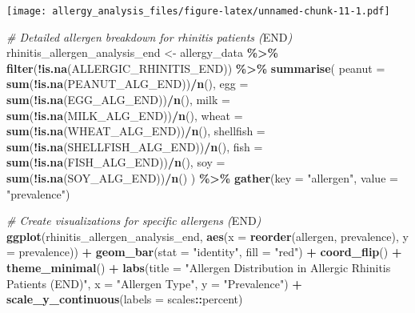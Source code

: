 \documentclass[
]{article}
\newenvironment{Shaded}{\begin{snugshade}}{\end{snugshade}}
\newcommand{\AttributeTok}[1]{\textcolor[rgb]{0.13,0.29,0.53}{#1}}
\newcommand{\CommentTok}[1]{\textcolor[rgb]{0.56,0.35,0.01}{\textit{#1}}}
\newcommand{\FunctionTok}[1]{\textcolor[rgb]{0.13,0.29,0.53}{\textbf{#1}}}
\newcommand{\NormalTok}[1]{#1}
\newcommand{\OtherTok}[1]{\textcolor[rgb]{0.56,0.35,0.01}{#1}}
\newcommand{\RegionMarkerTok}[1]{#1}
\newcommand{\SpecialCharTok}[1]{\textcolor[rgb]{0.81,0.36,0.00}{\textbf{#1}}}
\newcommand{\StringTok}[1]{\textcolor[rgb]{0.31,0.60,0.02}{#1}}
\begin{document}
\texttt{[image: allergy\_analysis\_files/figure-latex/unnamed-chunk-11-1.pdf]}

\begin{Shaded}
\begin{Highlighting}[]
\CommentTok{\# Detailed allergen breakdown for rhinitis patients (}\RegionMarkerTok{END}\CommentTok{)}
\NormalTok{rhinitis\_allergen\_analysis\_end }\OtherTok{\textless{}{-}}\NormalTok{ allergy\_data }\SpecialCharTok{\%\textgreater{}\%}
  \FunctionTok{filter}\NormalTok{(}\SpecialCharTok{!}\FunctionTok{is.na}\NormalTok{(ALLERGIC\_RHINITIS\_END)) }\SpecialCharTok{\%\textgreater{}\%}
  \FunctionTok{summarise}\NormalTok{(}
    \AttributeTok{peanut =} \FunctionTok{sum}\NormalTok{(}\SpecialCharTok{!}\FunctionTok{is.na}\NormalTok{(PEANUT\_ALG\_END))}\SpecialCharTok{/}\FunctionTok{n}\NormalTok{(),}
    \AttributeTok{egg =} \FunctionTok{sum}\NormalTok{(}\SpecialCharTok{!}\FunctionTok{is.na}\NormalTok{(EGG\_ALG\_END))}\SpecialCharTok{/}\FunctionTok{n}\NormalTok{(),}
    \AttributeTok{milk =} \FunctionTok{sum}\NormalTok{(}\SpecialCharTok{!}\FunctionTok{is.na}\NormalTok{(MILK\_ALG\_END))}\SpecialCharTok{/}\FunctionTok{n}\NormalTok{(),}
    \AttributeTok{wheat =} \FunctionTok{sum}\NormalTok{(}\SpecialCharTok{!}\FunctionTok{is.na}\NormalTok{(WHEAT\_ALG\_END))}\SpecialCharTok{/}\FunctionTok{n}\NormalTok{(),}
    \AttributeTok{shellfish =} \FunctionTok{sum}\NormalTok{(}\SpecialCharTok{!}\FunctionTok{is.na}\NormalTok{(SHELLFISH\_ALG\_END))}\SpecialCharTok{/}\FunctionTok{n}\NormalTok{(),}
    \AttributeTok{fish =} \FunctionTok{sum}\NormalTok{(}\SpecialCharTok{!}\FunctionTok{is.na}\NormalTok{(FISH\_ALG\_END))}\SpecialCharTok{/}\FunctionTok{n}\NormalTok{(),}
    \AttributeTok{soy =} \FunctionTok{sum}\NormalTok{(}\SpecialCharTok{!}\FunctionTok{is.na}\NormalTok{(SOY\_ALG\_END))}\SpecialCharTok{/}\FunctionTok{n}\NormalTok{()}
\NormalTok{  ) }\SpecialCharTok{\%\textgreater{}\%}
  \FunctionTok{gather}\NormalTok{(}\AttributeTok{key =} \StringTok{"allergen"}\NormalTok{, }\AttributeTok{value =} \StringTok{"prevalence"}\NormalTok{)}

\CommentTok{\# Create visualizations for specific allergens (}\RegionMarkerTok{END}\CommentTok{)}
\FunctionTok{ggplot}\NormalTok{(rhinitis\_allergen\_analysis\_end, }
       \FunctionTok{aes}\NormalTok{(}\AttributeTok{x =} \FunctionTok{reorder}\NormalTok{(allergen, prevalence), }\AttributeTok{y =}\NormalTok{ prevalence)) }\SpecialCharTok{+}
  \FunctionTok{geom\_bar}\NormalTok{(}\AttributeTok{stat =} \StringTok{"identity"}\NormalTok{, }\AttributeTok{fill =} \StringTok{"red"}\NormalTok{) }\SpecialCharTok{+}
  \FunctionTok{coord\_flip}\NormalTok{() }\SpecialCharTok{+}
  \FunctionTok{theme\_minimal}\NormalTok{() }\SpecialCharTok{+}
  \FunctionTok{labs}\NormalTok{(}\AttributeTok{title =} \StringTok{"Allergen Distribution in Allergic Rhinitis Patients (END)"}\NormalTok{,}
       \AttributeTok{x =} \StringTok{"Allergen Type"}\NormalTok{,}
       \AttributeTok{y =} \StringTok{"Prevalence"}\NormalTok{) }\SpecialCharTok{+}
  \FunctionTok{scale\_y\_continuous}\NormalTok{(}\AttributeTok{labels =}\NormalTok{ scales}\SpecialCharTok{::}\NormalTok{percent)}
\end{Highlighting}
\end{Shaded}
\end{document}
